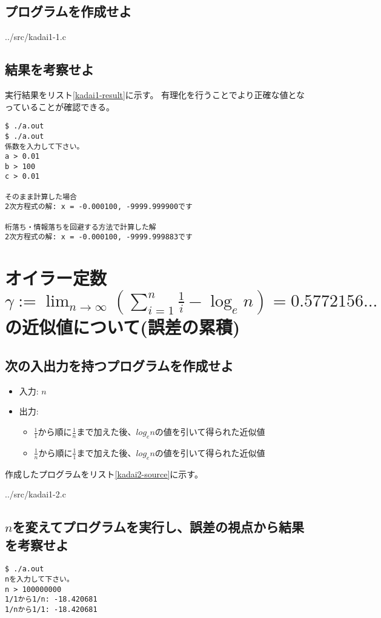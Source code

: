 \documentclass[]{jsarticle}
\begin{document}
\subsection{プログラムを作成せよ}


{../src/kadai1-1.c}


\subsection{結果を考察せよ}

実行結果をリスト\ref{kadai1-result}に示す。
有理化を行うことでより正確な値となっていることが確認できる。

\begin{lstlisting}[caption=実行結果,label=kadai1-result]
$ ./a.out
$ ./a.out
係数を入力して下さい。
a > 0.01
b > 100
c > 0.01

そのまま計算した場合
2次方程式の解: x = -0.000100, -9999.999900です

桁落ち・情報落ちを回避する方法で計算した解
2次方程式の解: x = -0.000100, -9999.999883です
\end{lstlisting}

\section{オイラー定数$\gamma:=\lim_{n \to \infty} \left(\sum_{i=1}^{n} \frac{1}{i} - \log_{e} n\right)=0.5772156...$の近似値について(誤差の累積)}

\subsection{次の入出力を持つプログラムを作成せよ}

\begin{itemize}
\item 入力: $n$
\item 出力:
\begin{itemize}
\item $\frac{1}{1}$から順に$\frac{1}{n}$まで加えた後、$log_{e} n$の値を引いて得られた近似値
\item $\frac{1}{n}$から順に$\frac{1}{1}$まで加えた後、$log_{e} n$の値を引いて得られた近似値
\end{itemize}
\end{itemize}

作成したプログラムをリスト\ref{kadai2-source}に示す。


{../src/kadai1-2.c}

\subsection{$n$を変えてプログラムを実行し、誤差の視点から結果を考察せよ}

\begin{lstlisting}[caption=実行結果,label=kadai2-result]
$ ./a.out
nを入力して下さい。
n > 100000000
1/1から1/n: -18.420681
1/nから1/1: -18.420681
\end{lstlisting}
\end{document}
